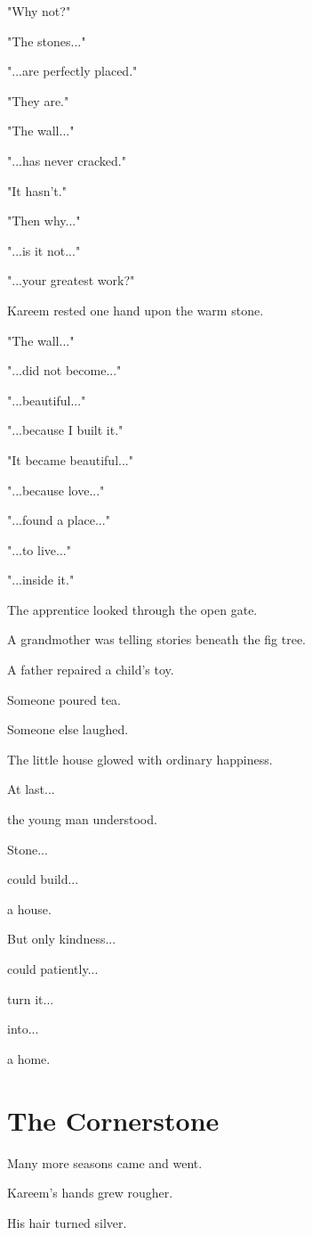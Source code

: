 \documentclass[12pt,openany]{book}
\begin{document}
"Why not?"

"The stones..."

"...are perfectly placed."

"They are."

"The wall..."

"...has never cracked."

"It hasn't."

"Then why..."

"...is it not..."

"...your greatest work?"

Kareem rested one hand upon the warm stone.

"The wall..."

"...did not become..."

"...beautiful..."

"...because I built it."

"It became beautiful..."

"...because love..."

"...found a place..."

"...to live..."

"...inside it."

The apprentice looked through the open gate.

A grandmother was telling stories beneath the fig tree.

A father repaired a child's toy.

Someone poured tea.

Someone else laughed.

The little house glowed with ordinary happiness.

At last...

the young man understood.

Stone...

could build...

a house.

But only kindness...

could patiently...

turn it...

into...

a home.
\section*{The Cornerstone}

Many more seasons came and went.

Kareem's hands grew rougher.

His hair turned silver.
\end{document}
